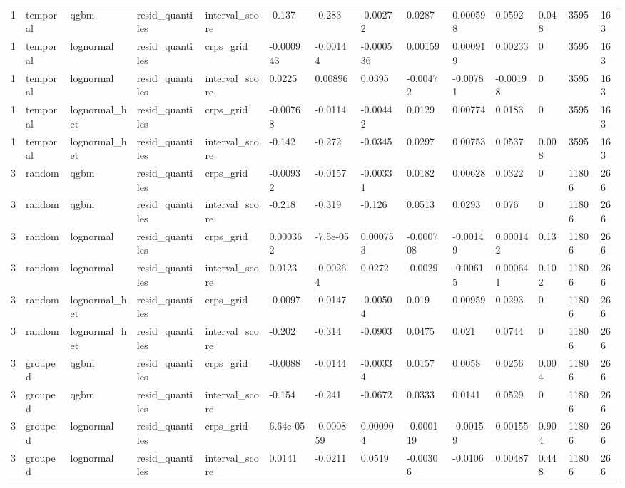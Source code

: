 \begin{tabular}{llllllllllllll}
1 & temporal & qgbm & resid\_quantiles & interval\_score & -0.137 & -0.283 & -0.00272 & 0.0287 & 0.000598 & 0.0592 & 0.048 & 3595 & 163 \\
1 & temporal & lognormal & resid\_quantiles & crps\_grid & -0.000943 & -0.00144 & -0.000536 & 0.00159 & 0.000919 & 0.00233 & 0 & 3595 & 163 \\
1 & temporal & lognormal & resid\_quantiles & interval\_score & 0.0225 & 0.00896 & 0.0395 & -0.00472 & -0.00781 & -0.00198 & 0 & 3595 & 163 \\
1 & temporal & lognormal\_het & resid\_quantiles & crps\_grid & -0.00768 & -0.0114 & -0.00442 & 0.0129 & 0.00774 & 0.0183 & 0 & 3595 & 163 \\
1 & temporal & lognormal\_het & resid\_quantiles & interval\_score & -0.142 & -0.272 & -0.0345 & 0.0297 & 0.00753 & 0.0537 & 0.008 & 3595 & 163 \\
3 & random & qgbm & resid\_quantiles & crps\_grid & -0.00932 & -0.0157 & -0.00331 & 0.0182 & 0.00628 & 0.0322 & 0 & 11806 & 266 \\
3 & random & qgbm & resid\_quantiles & interval\_score & -0.218 & -0.319 & -0.126 & 0.0513 & 0.0293 & 0.076 & 0 & 11806 & 266 \\
3 & random & lognormal & resid\_quantiles & crps\_grid & 0.000362 & -7.5e-05 & 0.000753 & -0.000708 & -0.00149 & 0.000142 & 0.13 & 11806 & 266 \\
3 & random & lognormal & resid\_quantiles & interval\_score & 0.0123 & -0.00264 & 0.0272 & -0.0029 & -0.00615 & 0.000641 & 0.102 & 11806 & 266 \\
3 & random & lognormal\_het & resid\_quantiles & crps\_grid & -0.0097 & -0.0147 & -0.00504 & 0.019 & 0.00959 & 0.0293 & 0 & 11806 & 266 \\
3 & random & lognormal\_het & resid\_quantiles & interval\_score & -0.202 & -0.314 & -0.0903 & 0.0475 & 0.021 & 0.0744 & 0 & 11806 & 266 \\
3 & grouped & qgbm & resid\_quantiles & crps\_grid & -0.0088 & -0.0144 & -0.00334 & 0.0157 & 0.0058 & 0.0256 & 0.004 & 11806 & 266 \\
3 & grouped & qgbm & resid\_quantiles & interval\_score & -0.154 & -0.241 & -0.0672 & 0.0333 & 0.0141 & 0.0529 & 0 & 11806 & 266 \\
3 & grouped & lognormal & resid\_quantiles & crps\_grid & 6.64e-05 & -0.000859 & 0.000904 & -0.000119 & -0.00159 & 0.00155 & 0.904 & 11806 & 266 \\
3 & grouped & lognormal & resid\_quantiles & interval\_score & 0.0141 & -0.0211 & 0.0519 & -0.00306 & -0.0106 & 0.00487 & 0.448 & 11806 & 266 \\

\end{tabular}
